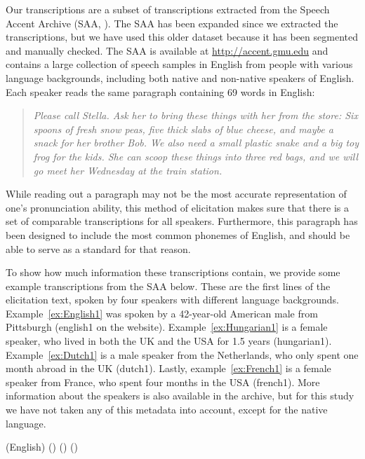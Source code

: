 \documentclass[output=paper]{LSP/langsci}
\begin{document}
Our transcriptions are a subset of transcriptions extracted from the Speech Accent Archive (SAA, \citealt{weinberger_speech_2011}). The SAA has been expanded since we extracted the transcriptions, but we have used this older dataset because it has been segmented and manually checked. The SAA is available at \url{http://accent.gmu.edu} and contains a large collection of speech samples in English from people with various language backgrounds, including both native and non-native speakers of English. Each speaker reads the same paragraph containing 69 words in English:

\begin{quote}
\textit{Please call Stella. Ask her to bring these things with her from the store: Six spoons of fresh snow peas, five thick slabs of blue cheese, and maybe a snack for her brother Bob. We also need a small plastic snake and a big toy frog for the kids. She can scoop these things into three red bags, and we will go meet her Wednesday at the train station.}
\end{quote}

While reading out a paragraph may not be the most accurate representation of one's pronunciation ability, this method of elicitation makes sure that there is a set of comparable transcriptions for all speakers. Furthermore, this paragraph has been designed to include the most common phonemes of English, and should be able to serve as a standard for that reason.

To show how much information these transcriptions contain, we provide some example transcriptions from the SAA below. These are the first lines of the elicitation text, spoken by four speakers with different language backgrounds. Example~\ref{ex:English1} was spoken by a 42-year-old American male from Pittsburgh (english1 on the website). Example~\ref{ex:Hungarian1} is a female  speaker, who lived in both the UK and the USA for 1.5 years (hungarian1). Example~\ref{ex:Dutch1} is a male  speaker from the Netherlands, who only spent one month abroad in the UK (dutch1). Lastly, example~\ref{ex:French1} is a female speaker from France, who spent four months in the USA (french1). More information about the speakers is also available in the archive, but for this study we have not taken any of this metadata into account, except for the native language.

\begin{exe}
\ex \label{ex:English1} {} (English)
\ex \label{ex:Hungarian1} {} ()
\ex \label{ex:Dutch1} {} ()
\ex \label{ex:French1} {} ()
\end{exe}
\end{document}
